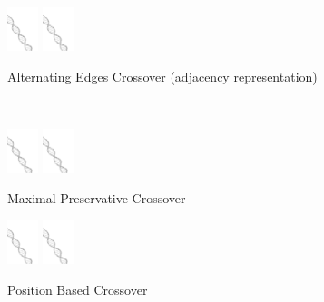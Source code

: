 \begin{figure}
	\centering
%
	\begin{subfigure}[b]{0.3\textwidth}
		\centering
		\includegraphics[width=0.1\textwidth]{res/cover.png}
		\includegraphics[width=0.1\textwidth]{res/cover.png}
		\caption{Alternating Edges Crossover (adjacency representation)}
		\label{fig:z}
    	\end{subfigure}\\
%
	\begin{subfigure}[b]{0.3\textwidth}
		\centering
		\includegraphics[width=0.1\textwidth]{res/cover.png}
		\includegraphics[width=0.1\textwidth]{res/cover.png}
		\caption{Maximal Preservative Crossover}
		\label{fig:x}
    	\end{subfigure}
%
	\begin{subfigure}[b]{0.3\textwidth}
		\centering
		\includegraphics[width=0.1\textwidth]{res/cover.png}
		\includegraphics[width=0.1\textwidth]{res/cover.png}
		\caption{Position Based Crossover}
		\label{fig:y}
    	\end{subfigure}
%
	\begin{subfigure}[b]{0.3\textwidth}

\end{subfigure}
\end{figure}
